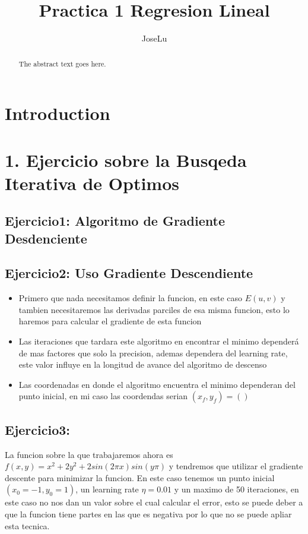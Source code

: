\documentclass{article}
\begin{document}
\title{Practica 1 Regresion Lineal}
\author{JoseLu}

\maketitle

\begin{abstract}
The abstract text goes here.
\end{abstract}

\section{Introduction}


\section{1. Ejercicio sobre la Busqeda Iterativa de Optimos}

\subsection{Ejercicio1: Algoritmo de Gradiente Desdenciente}
\subsection{Ejercicio2: Uso Gradiente Descendiente}
  \begin{itemize}
    \item[] Primero que nada necesitamos definir la funcion, en este caso $E(u,v)$ y tambien necesitaremos las derivadas parciles de esa misma funcion, esto lo haremos para calcular el gradiente de 
    esta funcion
    \item[] Las iteraciones que tardara este algoritmo en encontrar el minimo dependerá de mas factores que solo la precision, ademas dependera del learning rate, este valor influye en la longitud de avance del algoritmo de descenso 
    \item[] Las coordenadas en donde el algoritmo encuentra el minimo dependeran del punto inicial, en mi caso las coordendas serian $(x_f, y_f) = ()$ 
  \end{itemize}

\subsection{Ejercicio3:}
La funcion sobre la que trabajaremos ahora es $f(x,y) = x^2 + 2y^2 +2sin(2\pi x)sin(y\pi)$
y tendremos que utilizar el gradiente descente para minimizar la funcion.
En este caso tenemos un punto inicial $(x_0 = -1, y_0 = 1)$, un learning rate $\eta = 0.01$ 
y un maximo de 50 iteraciones, en este caso no nos dan un valor sobre el cual calcular el error,
esto se puede deber a que la funcion tiene partes en las que es negativa por lo que no se puede apliar esta tecnica.
\end{document}

